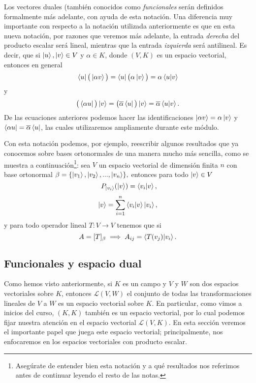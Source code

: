 \documentclass[12pt,dvipsnames]{article}
\begin{document}
\noindent Los vectores duales (también conocidos como \emph{funcionales} serán definidos formalmente más adelante, con ayuda de esta notación. Una diferencia muy importante con respecto a la notación utilizada anteriormente es que en esta nueva notación, por razones que veremos más adelante, la entrada \emph{derecha} del producto escalar será lineal, mientras que la entrada \emph{izquierda} será antilineal. Es decir, que si $\ket{u},\ket{v}\in V$ y $\alpha\in K$, donde $(V,K)$ es un espacio vectorial, entonces en general \[
    \bra{u}\big (\ket{\alpha v}\big ) = \bra{u}\big(\alpha\ket{v}\big) = \alpha\braket{u|v}
\] \noindent y \[
\big (\bra{\alpha u}\big ) \ket{v} = \big( \overline{\alpha}\bra{u}\big)\ket{v}  = \overline{\alpha}\braket{u|v}.
\] De las ecuaciones anteriores podemos hacer las identificaciones $\ket{\alpha v}=\alpha\ket{v}$ y $\bra{\alpha u}= \overline{\alpha}\bra{u}$, las cuales utilizaremos ampliamente durante este módulo. 

Con esta notación podemos, por ejemplo, reescribir algunos resultados que ya conocemos sobre bases ortonormales de una manera mucho más sencilla, como se muestra a continuación\footnote{Asegúrate de entender bien esta notación y a qué resultados nos referimos antes de continuar leyendo el resto de las notas.}: sea $V$ un espacio vectorial de dimensión finita $n$ con base ortonormal $\beta=\{\ket{v_1},\ket{v_2},...,\ket{v_n}\},$ entonces para todo $\ket{v}\in V$ \[\ P_{\ket{v_i}}(\ket{v})=\braket{v_i|v},\] \[\ket{v}=\sum_{i=1}^n \braket{v_i|v}\ket{v_i},
\] \noindent y para todo operador lineal $T:V\to V$ tenemos que si \[A=[T]_{\beta} \implies A_{ij}=\braket{T(v_j)|v_i}
.\] 

\newpage
\subsection{Funcionales y espacio dual} \label{Subsec:Funcionales_y_espacio_dual} 

Como hemos visto anteriormente, si $K$ es un campo y $V$ y $W$ son dos espacios vectoriales sobre $K$, entonces $\mathcal{L}(V,W)$ \textemdash el conjunto de todas las transformaciones lineales de $V$ a $W$\textemdash\hspace{0.5mm} es un espacio vectorial sobre $K$. En particular, como vimos a inicios del curso, $(K,K)$ también es un espacio vectorial, por lo cual podemos fijar nuestra atención en el espacio vectorial $\mathcal{L}(V,K)$. En esta sección veremos el importante papel que juega este espacio vectorial; principalmente, nos enfocaremos en los espacios vectoriales con producto escalar.
\end{document}
